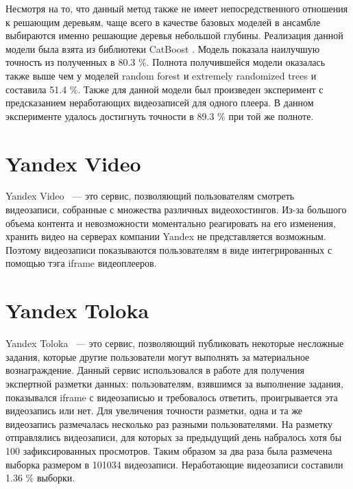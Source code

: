 Несмотря на то, что данный метод также не имеет непосредственного отношения к решающим деревьям, чаще всего в качестве базовых моделей в ансамбле выбираются именно решающие деревья небольшой глубины. Реализация данной модели была взята из библиотеки CatBoost \cite{Prokhorenkova2017}. Модель показала наилучшую точность из полученных в 80.3 \%. Полнота получившейся модели оказалась также выше чем у моделей random forest и extremely randomized trees и составила 51.4 \%. Также для данной модели был произведен эксперимент с предсказанием неработающих видеозаписей для одного плеера. В данном эксперименте удалось достигнуть точности в 89.3 \% при той же полноте.

\section{Yandex Video}

Yandex Video \cite{VideoSearch}~--- это сервис, позволяющий пользователям смотреть видеозаписи, собранные с множества различных видеохостингов. Из-за большого объема контента и невозможности моментально реагировать на его изменения, хранить видео на серверах компании Yandex не представляется возможным. Поэтому видеозаписи показываются пользователям в виде интегрированных с помощью тэга iframe видеоплееров.

\section{Yandex Toloka}

Yandex Toloka \cite{Toloka}~--- это сервис, позволяющий публиковать некоторые несложные задания, которые другие пользователи могут выполнять за материальное вознаграждение. Данный сервис использовался в работе для получения экспертной разметки данных: пользователям, взявшимся за выполнение задания, показывался iframe с видеозаписью и требовалось ответить, проигрывается эта видеозапись или нет. Для увеличения точности разметки, одна и та же видеозапись размечалась несколько раз разными пользователями. На разметку отправлялись видеозаписи, для которых за предыдущий день набралось хотя бы 100 зафиксированных просмотров. Таким образом за два раза была размечена выборка размером в 101034 видеозаписи. Неработающие видеозаписи составили 1.36 \% выборки.